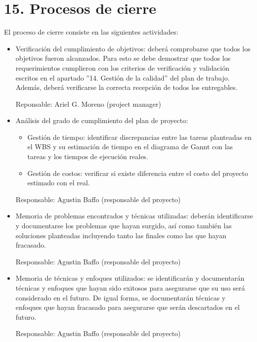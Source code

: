 \documentclass[
11pt, %
]{charter}
\begin{document}
\section{15. Procesos de cierre}    
\label{sec:cierre}

El proceso de cierre consiste en las siguientes actividades:

\begin{itemize}
\item Verificación del cumplimiento de objetivos: deberá comprobarse que todos los objetivos fueron alcanzados. Para esto se debe demostrar que todos los requerimientos cumplieron con los criterios de verificación y validación escritos en el apartado ''14. Gestión de la calidad'' del plan de trabajo. Además, deberá verificarse la correcta recepción de todos los entregables.

Reponsable: Ariel G. Moreno (project manager)


\item Análisis del grado de cumplimiento del plan de proyecto:

\begin{itemize}
\item  Gestión de tiempo: identificar discrepancias entre las tareas planteadas en el WBS y su estimación de tiempo en el diagrama de Gannt con las tareas y los tiempos de ejecución reales.
\item  Gestión de costos: verificar si existe diferencia entre el costo del proyecto estimado con el real.
\end{itemize}

Responsable: Agustin Baffo (responsable del proyecto)

\item Memoria de problemas encontrados y técnicas utilizadas:
deberán identificarse y documentarse los problemas que hayan surgido, así como también las soluciones planteadas incluyendo tanto las finales como las que hayan fracasado.

Responsable: Agustin Baffo (responsable del proyecto)


\item Memoria de técnicas y enfoques utilizados: se identificarán y documentarán técnicas y enfoques que hayan sido exitosos para asegurarse que su uso será considerado en el futuro. De igual forma, se documentarán técnicas y enfoques que hayan fracasado para asegurarse que serán descartados en el futuro.

Responsable: Agustin Baffo (responsable del proyecto)



\end{itemize}
\end{document}
